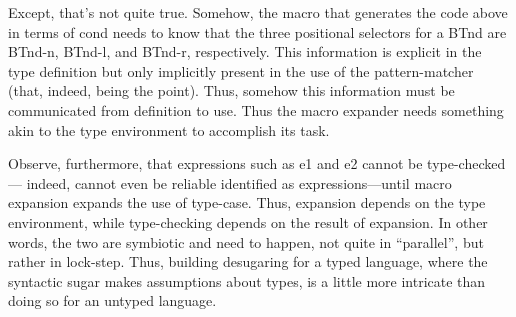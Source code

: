Except, that’s not quite true. Somehow, the macro that generates the code above
in terms of cond needs to know that the three positional selectors for a BTnd
are BTnd-n, BTnd-l, and BTnd-r, respectively. This information is explicit in
the type definition but only implicitly present in the use of the
pattern-matcher (that, indeed, being the point). Thus, somehow this information
must be communicated from definition to use. Thus the macro expander needs
something akin to the type environment to accomplish its task.

Observe, furthermore, that expressions such as e1 and e2 cannot be type-checked—
indeed, cannot even be reliable identified as expressions—until macro expansion
expands the use of type-case. Thus, expansion depends on the type environment,
while type-checking depends on the result of expansion. In other words, the two
are symbiotic and need to happen, not quite in “parallel”, but rather in
lock-step. Thus, building desugaring for a typed language, where the syntactic
sugar makes assumptions about types, is a little more intricate than doing so
for an untyped language.

\secup
